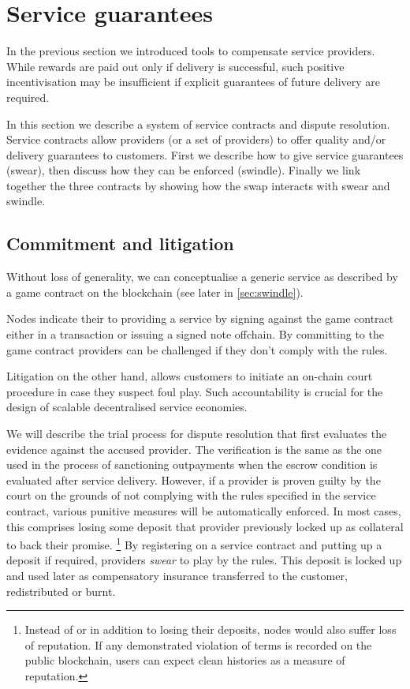\section{Service guarantees}
\label{sec:courtroom}

In the previous section we introduced tools to compensate service providers.
While rewards are paid out only if delivery is successful,
such positive incentivisation may be insufficient if
explicit guarantees of future delivery are required.

In this section we describe a system of service contracts and dispute resolution.
Service contracts allow providers (or a set of providers)
to offer quality and/or delivery guarantees to customers.
First we describe how to give service guarantees (swear), then discuss how they can be enforced (swindle).
Finally we link together the three contracts by showing how the swap interacts with swear and swindle.


\subsection{Commitment and litigation}

Without loss of generality, we can conceptualise a generic service as described by a game contract
on the blockchain (see later in \ref{sec:swindle}).


Nodes indicate their  to providing a service by signing against the game contract either in a transaction or issuing a signed note offchain. 
By committing to the game contract  providers can be challenged if they don't comply with the rules.

Litigation on the other hand, allows customers to initiate an on-chain court procedure
in case they suspect foul play. Such accountability is
crucial for the design of scalable decentralised service economies.

We will describe the trial process for dispute
resolution that first evaluates the evidence against the accused provider.
The verification is the same as the one used in the process of sanctioning outpayments when the escrow condition is evaluated after service delivery.
However, if a provider is proven guilty by the court on the grounds of not complying with the rules specified in the service contract, various punitive measures will be
automatically enforced. In most cases, this comprises losing some deposit that
provider previously locked up as collateral to back their promise.%
%
\footnote{Instead of or in addition to losing their deposits, nodes would also
suffer loss of reputation. If any demonstrated violation of terms is
recorded on the public blockchain, users can expect clean histories as a measure
of reputation.}
%
By registering on a service contract and putting up a deposit if required, providers
\emph{swear} to play by the rules.
This deposit is locked up and used later as compensatory insurance transferred to the
customer, redistributed or burnt.

